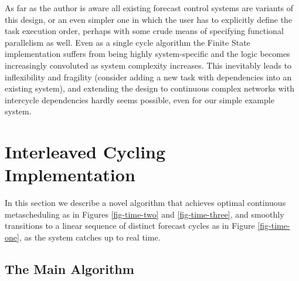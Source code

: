 \documentclass[11pt,a4paper]{article}
\begin{document}
As far as the author is aware all existing forecast control systems are
variants of this design, or an even simpler one in which the user has to
explicitly define the task execution order, perhaps with some crude
means of specifying functional parallelism as well. Even as a single
cycle algorithm the Finite State implementation suffers from being
highly system-specific and the logic becomes increasingly convoluted as
system complexity increases. This inevitably leads to inflexibility and
fragility (consider adding a new task with dependencies into an existing
system), and extending the design to continuous complex networks with
intercycle dependencies hardly seems possible, even for our simple
example system.


\section{Interleaved Cycling Implementation}

In this section we describe a novel algorithm that achieves optimal
continuous metascheduling as in Figures \ref{fig-time-two} and
\ref{fig-time-three}, and smoothly transitions to a linear sequence of
distinct forecast cycles as in Figure \ref{fig-time-one}, as the system
catches up to real time.  

\subsection{The Main Algorithm}
\end{document}
